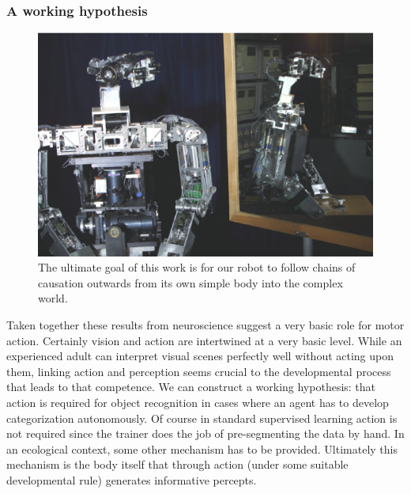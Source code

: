 %
%
%




\subsubsection*{A working hypothesis}


\begin{figure}[tbh]
\begin{center}
\includegraphics[width=12cm]{mirror-cog.eps}
\caption{ 
\label{fig:mirror-cog}
%
The ultimate goal of this work is for our robot to follow chains of
causation outwards from its own simple body into the complex world.
%
}
\end{center}
\end{figure}

Taken together these results from neuroscience suggest a very basic role
for motor action. Certainly vision and action are
intertwined at a very basic level.  While an
experienced adult can interpret visual scenes perfectly well without
acting upon them, linking action and perception seems crucial to the
developmental process that leads to that competence.  We can construct
a working hypothesis: that action is required for object recognition in
cases where an agent has to develop categorization autonomously. 
Of course in standard supervised learning action is not required since
the trainer does the job of pre-segmenting the data by hand.  In an
ecological context, some other mechanism has to be provided.
Ultimately this mechanism is the body itself that through action
(under some suitable developmental rule) generates informative
percepts.


